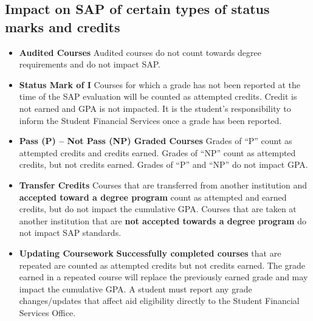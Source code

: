 \documentclass[
  letterpaper,
]{scrbook}
\begin{document}
\subsection{Impact on SAP of certain types of status marks and
credits}\label{impact-on-sap-of-certain-types-of-status-marks-and-credits}

\begin{itemize}
\item
  \textbf{Audited Courses} Audited courses do not count towards degree
  requirements and do not impact SAP.
\item
  \textbf{Status Mark of I} Courses for which a grade has not been
  reported at the time of the SAP evaluation will be counted as
  attempted credits. Credit is not earned and GPA is not impacted. It is
  the student's responsibility to inform the Student Financial Services
  once a grade has been reported.
\item
  \textbf{Pass (P) -- Not Pass (NP) Graded Courses} Grades of ``P''
  count as attempted credits and credits earned. Grades of ``NP'' count
  as attempted credits, but not credits earned. Grades of ``P'' and
  ``NP'' do not impact GPA.
\item
  \textbf{Transfer Credits} Courses that are transferred from another
  institution and \textbf{accepted toward a degree program} count as
  attempted and earned credits, but do not impact the cumulative GPA.
  Courses that are taken at another institution that are \textbf{not
  accepted towards a degree program} do not impact SAP standards.
\item
  \textbf{Updating Coursework} \textbf{Successfully completed courses}
  that are repeated are counted as attempted credits but not credits
  earned. The grade earned in a repeated course will replace the
  previously earned grade and may impact the cumulative GPA. A student
  must report any grade changes/updates that affect aid eligibility
  directly to the Student Financial Services Office.


\end{itemize}
\end{document}
